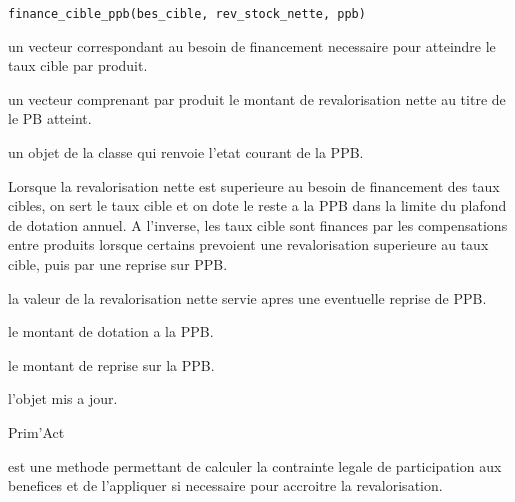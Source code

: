 \documentclass[a4paper]{book}
\begin{document}
%
\begin{Usage}
\begin{verbatim}
finance_cible_ppb(bes_cible, rev_stock_nette, ppb)
\end{verbatim}
\end{Usage}
%
\begin{Arguments}
\begin{ldescription}
\item[\code{bes\_cible}] un vecteur  correspondant au besoin de financement necessaire pour atteindre
le taux cible par produit.

\item[\code{rev\_stock\_nette}] un vecteur  comprenant par produit
le montant de revalorisation nette au titre de le PB atteint.

\item[\code{ppb}] un objet de la classe  qui renvoie l'etat courant de la PPB.
\end{ldescription}
\end{Arguments}
%
\begin{Details}\relax
Lorsque la revalorisation nette est superieure au besoin de financement des taux cibles,
on sert le taux cible et on dote le reste a la PPB dans la limite du plafond de dotation annuel.
A l'inverse, les taux cible sont finances par les compensations entre produits lorsque certains
prevoient une revalorisation superieure au taux cible, puis
par une reprise sur PPB.
\end{Details}
%
\begin{Value}
 la valeur de la revalorisation nette servie apres une eventuelle reprise de PPB.

 le montant de dotation a la PPB.

 le montant de reprise sur la PPB.

 l'objet  mis a jour.
\end{Value}
%
\begin{Author}\relax
Prim'Act
\end{Author}
%
\begin{Description}\relax
{} est une methode permettant de calculer la contrainte legale
de participation aux benefices et de l'appliquer si necessaire pour accroitre la revalorisation.
\end{Description}
\end{document}
